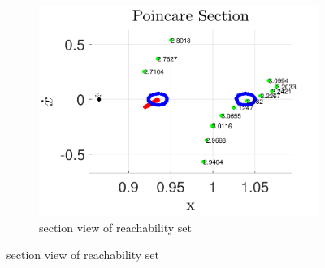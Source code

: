 \documentclass[smallcondensed]{svjour3}
\begin{document}
\begin{figure}
\begin{subfigure}[htbp]{0.5\textwidth}
                \includegraphics[width=\textwidth]{poincare_compare} 
                \caption{\Poincare section view of reachability set} \label{fig:poincare_compare} 
        \end{subfigure} %
                

\end{figure}
\end{document}
